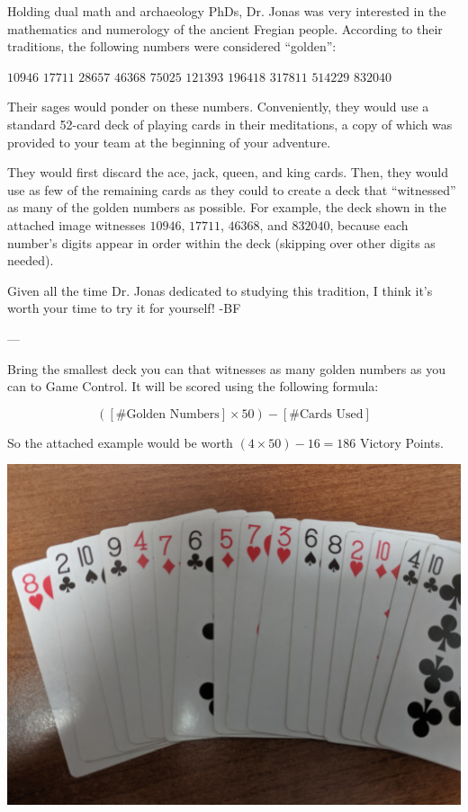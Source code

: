 Holding dual math and archaeology PhDs, Dr. Jonas was very interested in the
mathematics and numerology of the ancient Fregian people. According to
their traditions, the following numbers were considered ``golden'':

\(10946\)\hfill
\(17711\)\hfill
\(28657\)\hfill
\(46368\)\hfill
\(75025\)\hfill
\(121393\)\hfill
\(196418\)\hfill
\(317811\)\hfill
\(514229\)\hfill
\(832040\)

Their sages would ponder on these numbers. Conveniently, they would
use a standard 52-card deck of playing cards in their meditations,
a copy of which was provided to your team at the beginning of your adventure.

They would first discard the ace, jack, queen, and king cards. Then, they
would use as few of the remaining cards as they could to create a deck that 
``witnessed'' as many of the golden numbers as possible. For example, the deck shown in
the attached image witnesses \(10946\), \(17711\), \(46368\),
and \(832040\), because each number's digits appear in order within the deck
(skipping over other digits as needed).

Given all the time Dr. Jonas dedicated to studying this tradition, I think it's worth your
time to try it for yourself! -BF

---

Bring the smallest deck you can that witnesses
as many golden numbers as you can to Game Control. It will be scored using
the following formula:

\[([\# \textrm{Golden Numbers}]\times 50)-[\# \textrm{Cards Used}]\]

So the attached example would be worth \((4\times 50)-16=186\) Victory Points.

\begin{center}\includegraphics[width=0.5\linewidth]{assets/cards.jpg}\end{center}
